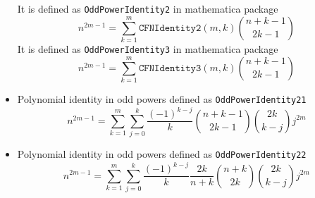 \begin{itemize}
\begin{equation*}
    \end{equation*}
    It is defined as \texttt{OddPowerIdentity2} in mathematica package
    \begin{equation*}
        n^{2m-1} = \sum_{k=1}^{m} \mathtt{CFNIdentity2} (m,k) \binom{n+k-1}{2k-1}
    \end{equation*}
    It is defined as \texttt{OddPowerIdentity3} in mathematica package
    \begin{equation*}
        n^{2m-1} = \sum_{k=1}^{m} \mathtt{CFNIdentity3} (m,k) \binom{n+k-1}{2k-1}
    \end{equation*}
    \item Polynomial identity in odd powers defined as \texttt{OddPowerIdentity21}
    \begin{equation*}
        n^{2m-1} = \sum_{k=1}^{m} \sum_{j=0}^{k} \frac{(-1)^{k-j}}{k} \binom{n+k-1}{2k-1} \binom{2k}{k-j} j^{2m}
    \end{equation*}
    \item Polynomial identity in odd powers defined as \texttt{OddPowerIdentity22}
    \begin{equation*}
        n^{2m-1} = \sum_{k=1}^{m} \sum_{j=0}^{k} \frac{(-1)^{k-j}}{k} \frac{2k}{n+k} \binom{n+k}{2k} \binom{2k}{k-j} j^{2m}
    \end{equation*}
\end{itemize}